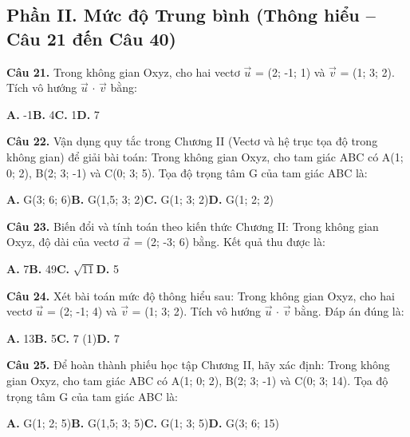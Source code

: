 \documentclass[11pt,a4paper]{article}
\begin{document}
\subsection*{\color{accent} Phần II. Mức độ Trung bình (Thông hiểu -- Câu 21 đến Câu 40)}
\textbf{\color{primary} Câu 21.} Trong không gian Oxyz, cho hai vectơ $\vec{u}$ = (2; -1; 1) và $\vec{v}$ = (1; 3; 2). Tích vô hướng $\vec{u}$ $\cdot$ $\vec{v}$ bằng:\par
\hspace*{1.5em}\textbf{A.} -1\quad\quad \textbf{B.} 4\quad\quad \textbf{C.} 1\quad\quad \textbf{D.} 7\par\vspace{2pt}
\textbf{\color{primary} Câu 22.} Vận dụng quy tắc trong Chương II (Vectơ và hệ trục tọa độ trong không gian) để giải bài toán: Trong không gian Oxyz, cho tam giác ABC có A(1; 0; 2), B(2; 3; -1) và C(0; 3; 5). Tọa độ trọng tâm G của tam giác ABC là:\par
\hspace*{1.5em}\textbf{A.} G(3; 6; 6)\quad\quad \textbf{B.} G(1,5; 3; 2)\quad\quad \textbf{C.} G(1; 3; 2)\quad\quad \textbf{D.} G(1; 2; 2)\par\vspace{2pt}
\textbf{\color{primary} Câu 23.} Biến đổi và tính toán theo kiến thức Chương II: Trong không gian Oxyz, độ dài của vectơ $\vec{a}$ = (2; -3; 6) bằng. Kết quả thu được là:\par
\hspace*{1.5em}\textbf{A.} 7\quad\quad \textbf{B.} 49\quad\quad \textbf{C.} $\sqrt{11}$\quad\quad \textbf{D.} 5\par\vspace{2pt}
\textbf{\color{primary} Câu 24.} Xét bài toán mức độ thông hiểu sau: Trong không gian Oxyz, cho hai vectơ $\vec{u}$ = (2; -1; 4) và $\vec{v}$ = (1; 3; 2). Tích vô hướng $\vec{u}$ $\cdot$ $\vec{v}$ bằng. Đáp án đúng là:\par
\hspace*{1.5em}\textbf{A.} 13\quad\quad \textbf{B.} 5\quad\quad \textbf{C.} 7 (1)\quad\quad \textbf{D.} 7\par\vspace{2pt}
\textbf{\color{primary} Câu 25.} Để hoàn thành phiếu học tập Chương II, hãy xác định: Trong không gian Oxyz, cho tam giác ABC có A(1; 0; 2), B(2; 3; -1) và C(0; 3; 14). Tọa độ trọng tâm G của tam giác ABC là:\par
\hspace*{1.5em}\textbf{A.} G(1; 2; 5)\quad\quad \textbf{B.} G(1,5; 3; 5)\quad\quad \textbf{C.} G(1; 3; 5)\quad\quad \textbf{D.} G(3; 6; 15)\par\vspace{2pt}
\end{document}
